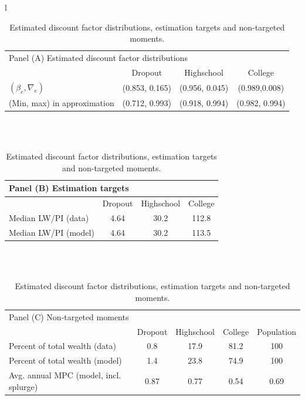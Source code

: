 \documentclass[../HAFiscal]{subfiles}
\begin{document}
\begin{table}[th]
\begin{center}
\begin{tabular}{l}
	\begin{tabular}{lccc}
		\multicolumn{4}{l}{Panel (A) Estimated discount factor distributions} \\ 
		& Dropout & Highschool & College \\ \midrule
		$(\beta_e, \nabla_e)$ & (0.853, 0.165) & (0.956, 0.045) & (0.989,0.008) \\
		(Min, max) in approximation & (0.712, 0.993) & (0.918, 0.994) & (0.982, 0.994) \\
		\midrule 
	\end{tabular} \\ \\ 
	
	\begin{tabular}{lccc}
		\multicolumn{4}{l}{Panel (B) Estimation targets} \\ \midrule
		& Dropout & Highschool & College \\ \midrule
		Median LW/PI (data) & 4.64 & 30.2 & 112.8 \\ 
		Median LW/PI (model) & 4.64 & 30.2 & 113.5 %
		\\ \midrule 
	\end{tabular} \\ \\ 
	
	\begin{tabular}{lcccc}
		\multicolumn{5}{l}{Panel (C) Non-targeted moments} \\ 
		& Dropout & Highschool & College & Population \\ \midrule
		Percent of total wealth (data) & 0.8 & 17.9 & 81.2 & 100 \\
		Percent of total wealth (model) & 1.4 & 23.8 & 74.9 & 100 \\
		Avg. annual MPC (model, incl. splurge) & 0.87 & 0.77 & 0.54 & 0.69
		\\ \bottomrule 
	\end{tabular}
\end{tabular}
\caption{Estimated discount factor distributions, estimation targets and non-targeted moments.}
\label{tab:estimBetas}
\end{center}
\end{table}
\end{document}
